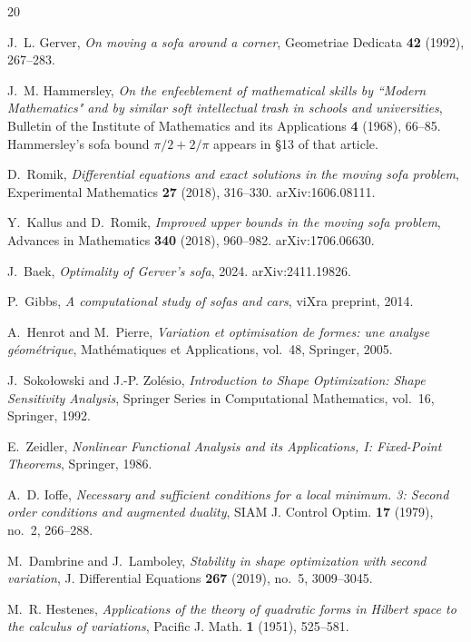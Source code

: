 \documentclass[11pt]{amsart}
\theoremstyle{plain}
\theoremstyle{definition}
\begin{document}
\begin{thebibliography}{20}

J.~L. Gerver, \emph{On moving a sofa around a corner}, Geometriae
Dedicata \textbf{42} (1992), 267--283.

J.~M. Hammersley, \emph{On the enfeeblement of mathematical skills
by ``Modern Mathematics" and by similar soft intellectual trash in
schools and universities}, Bulletin of the Institute of Mathematics
and its Applications \textbf{4} (1968), 66--85.  Hammersley's sofa
bound $\pi/2 + 2/\pi$ appears in §13 of that article.

D.~Romik, \emph{Differential equations and exact solutions in the
moving sofa problem}, Experimental Mathematics \textbf{27} (2018),
316--330.  arXiv:1606.08111.

Y.~Kallus and D.~Romik, \emph{Improved upper bounds in the moving
sofa problem}, Advances in Mathematics \textbf{340} (2018), 960--982.
arXiv:1706.06630.

J.~Baek, \emph{Optimality of Gerver's sofa}, 2024.
arXiv:2411.19826.

P.~Gibbs, \emph{A computational study of sofas and cars}, viXra
preprint, 2014.

A.~Henrot and M.~Pierre, \emph{Variation et optimisation de formes:
une analyse g\'eom\'etrique}, Math\'ematiques et Applications, vol.~48,
Springer, 2005.

J.~Soko{\l}owski and J.-P. Zol\'esio, \emph{Introduction to Shape
Optimization: Shape Sensitivity Analysis}, Springer Series in
Computational Mathematics, vol.~16, Springer, 1992.

E.~Zeidler, \emph{Nonlinear Functional Analysis and its Applications,
I: Fixed-Point Theorems}, Springer, 1986.

A.~D. Ioffe, \emph{Necessary and sufficient conditions for a local
minimum.  3: Second order conditions and augmented duality},
SIAM J. Control Optim. \textbf{17} (1979), no.~2, 266--288.

M.~Dambrine and J.~Lamboley, \emph{Stability in shape optimization
with second variation}, J. Differential Equations \textbf{267} (2019),
no.~5, 3009--3045.

M.~R. Hestenes, \emph{Applications of the theory of quadratic forms in
Hilbert space to the calculus of variations}, Pacific J. Math.
\textbf{1} (1951), 525--581.


\end{thebibliography}
\end{document}
